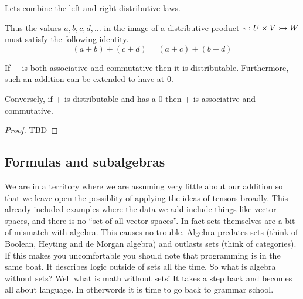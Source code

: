 Lets combine the left and right 
distributive laws.

\begin{center}
\end{center}
Thus the values $a,b,c,d,\ldots $ in the image of a distributive product $*:U\times V\rightarrowtail W$ must 
satisfy the following identity.
\begin{equation}
    \tag{Distributable}
    (a+b)+(c+d) = (a+c)+(b+d)
\end{equation}

\begin{proposition}
    If $+$ is both associative and commutative then it is distributable.
    Furthermore, such an addition can be extended to have at $0$.

    Conversely, if $+$ is distributable and has a $0$ then $+$ is associative 
    and commutative.
\end{proposition}
\begin{proof}
    TBD
\end{proof}

\subsection{Formulas and subalgebras}
We are in a territory where we are assuming very little about our addition 
so that we leave open the possiblity of applying the ideas of tensors broadly.
This already included examples where the data we add include things like vector spaces,
and there is no ``set of all vector spaces''.  In fact sets themselves are a bit 
of mismatch with algebra.  This causes no trouble.  Algebra predates sets 
(think of Boolean, Heyting and de Morgan algebra) and outlasts sets (think 
of categories).  If this makes you uncomfortable you should note that programming 
is in the same boat.  It describes logic outside of sets all the time.
So what is algebra without sets?  Well what is math without sets! 
It takes a step back and becomes all about language.  In otherwords 
it is time to go back to grammar school.

